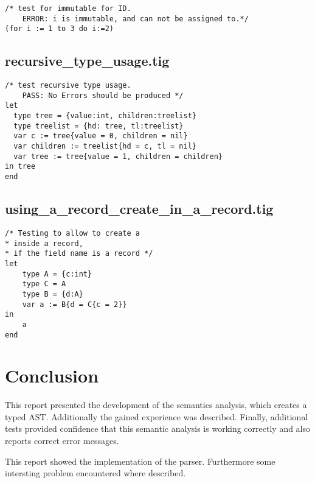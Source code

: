 \documentclass{article}
\begin{document}
\begin{lstlisting}[frame=single]
/* test for immutable for ID.
	ERROR: i is immutable, and can not be assigned to.*/
(for i := 1 to 3 do i:=2)
\end{lstlisting}

\subsection{recursive\_type\_usage.tig}

\begin{lstlisting}[frame=single]
 /* test recursive type usage.
	PASS: No Errors should be produced */
let
  type tree = {value:int, children:treelist}
  type treelist = {hd: tree, tl:treelist}
  var c := tree{value = 0, children = nil}
  var children := treelist{hd = c, tl = nil}
  var tree := tree{value = 1, children = children}
in tree
end
\end{lstlisting}

\subsection{using\_a\_record\_create\_in\_a\_record.tig}

\begin{lstlisting}[frame=single]
/* Testing to allow to create a
* inside a record,
* if the field name is a record */
let
	type A = {c:int}
	type C = A
	type B = {d:A}
	var a := B{d = C{c = 2}}
in
	a
end
\end{lstlisting}

\section{Conclusion}
This report presented the development of the semantics analysis, which creates a typed AST. Additionally the gained experience was described. Finally, additional tests provided confidence that this semantic analysis is working correctly and also reports correct error messages.

This report showed the implementation of the parser. Furthermore some intersting problem encountered where described. 
\end{document}
